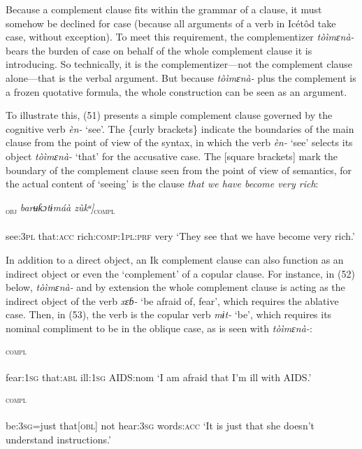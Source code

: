 Because a complement clause fits within the grammar of a clause, it must somehow be declined for case (because all arguments of a verb in Icétôd take case, without exception). To meet this requirement, the complementizer \textit{tòìmɛnà-} bears the burden of case on behalf of the whole complement clause it is introducing. So technically, it is the complementizer—not the complement clause alone—that is the verbal argument. But because \textit{tòìmɛnà-} plus the complement is a frozen quotative formula, the whole construction can be seen as an argument.

To illustrate this, (51) presents a simple complement clause governed by the cognitive verb \textit{èn-} ‘see’. The \{curly brackets\} indicate the boundaries of the main clause from the point of view of the syntax, in which the verb \textit{èn-} ‘see’ selects its object \textit{tòìmɛnà-} ‘that’ for the accusative case. The [square brackets] mark the boundary of the complement clause seen from the point of view of semantics, for the actual content of ‘seeing’ is the clause \textit{that we have become very rich}:




\ea\label{ex:}
\gll {\{Enáta  [toimɛnaa\}}\textsc{\textsubscript{obj}}\textit{ barʉƙɔtɨmáà   zùkᵘ]}\textsc{\textsubscript{compl}} \\
    \\
see:\textsc{3pl}   that:\textsc{acc}    rich:\textsc{comp:1pl:prf}   very
\glt ‘They see that we have become very rich.’ 
\z


In addition to a direct object, an Ik complement clause can also function as an indirect object or even the ‘complement’ of a copular clause. For instance, in (52) below, \textit{tòìmɛnà-} and by extension the whole complement clause is acting as the indirect object of the verb \textit{xɛɓ-} ‘be afraid of, fear’, which requires the ablative case. Then, in (53), the verb is the copular verb \textit{mɨt-} ‘be’, which requires its nominal compliment to be in the oblique case, as is seen with \textit{tòìmɛnà-}:



\ea\label{ex:}
\textsc{\textsubscript{compl}} \\
    \\
fear:\textsc{1sg}   that:\textsc{abl}   ill:\textsc{1sg}   AIDS:nom
\glt ‘I am afraid that I’m ill with AIDS.’ 
\z




\ea\label{ex:}
\textsc{\textsubscript{compl}} \\
    \\
be:\textsc{3sg}=just   that[\textsc{obl}]   not   hear:\textsc{3sg} words:\textsc{acc}
\glt ‘It is just that she doesn’t understand instructions.’ 
\z






